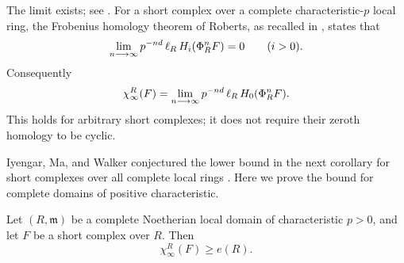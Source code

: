 The limit exists; see \cite[Section~4.17]{IMW2022}.  For a short
complex over a complete characteristic-$p$ local ring, the Frobenius
homology theorem of Roberts, as recalled in
\cite[Theorem~2.4]{Ma}, states that
\[
 \lim_{n\longrightarrow\infty}
 p^{-nd}\operatorname{\ell}_R H_i(\Phi_R^nF)=0\qquad(i>0).
\]
Consequently
\begin{equation}\label{eq:dutta-h0}
 \chi_\infty^R(F)=
 \lim_{n\longrightarrow\infty}
 p^{-nd}\operatorname{\ell}_R H_0(\Phi_R^nF).
\end{equation}
This holds for arbitrary short complexes; it does not require their
zeroth homology to be cyclic.

Iyengar, Ma, and Walker conjectured the lower bound in the next
corollary for short complexes over all complete local rings
\cite[Conjecture~8.1]{IMW2022}.  Here we prove the bound for complete
domains of positive characteristic.

\begin{corollary}
\label{cor:dutta-domain}
Let $(R,\mathfrak m)$ be a complete Noetherian local domain of
characteristic $p>0$, and let $F$ be a short complex over $R$.
Then
\[
                    \chi_\infty^R(F)\geq e(R).
\]
\end{corollary}

